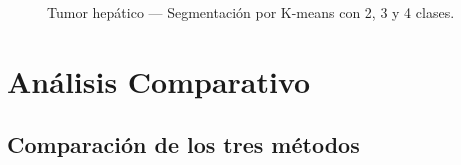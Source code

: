 \documentclass[12pt, a4paper]{article}
\begin{document}
\begin{figure}[H]
  \centering
  \caption{Tumor hepático — Segmentación por K-means con 2, 3 y 4 clases.}
  \label{fig:liver_kmeans}
\end{figure}

\section{Análisis Comparativo}

\subsection{Comparación de los tres métodos}
\end{document}
